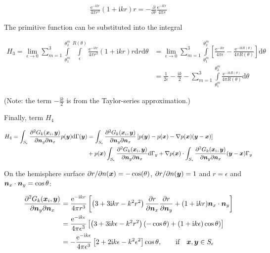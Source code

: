 \documentclass[a4paper, 10pt]{article}
\newcommand{\te}{\mathrm{e}}
\newcommand{\ti}{\mathrm{i}}
\newcommand{\td}{\mathrm{d}}
\newcommand{\tn}{\bm{\mathnormal{n}}}
\newcommand{\sx}{\bm{\mathnormal{x}}}
\newcommand{\sy}{\bm{\mathnormal{y}}}
\newcommand{\sn}{\bm{\mathnormal{n}}}
\newcommand{\limeps}{\lim\limits_{\epsilon \rightarrow 0}}
\newcommand{\summ}{\sum\limits_{m=1}^3}
\newcommand{\intme}{\int\limits_{\theta_1^m}^{\theta_2^m}\int\limits_\epsilon^{R(\theta)}}
\newcommand{\intms}{\int\limits_{\theta_1^m}^{\theta_2^m}}
\begin{document}
\begin{align}
	\frac{\te^{- \ti kr}}{4 \pi r^3}\left(1 + \ti kr\right) r = -\frac{\partial}{\partial r}\frac{\te ^ {-\ti kr}}{4\pi r}
\end{align}

The primitive function can be substituted into the integral

\begin{align}
	H_3 = \limeps \summ \intme \frac{\te^{- \ti kr}}{4 \pi r^3}\left(1 + \ti kr\right) r \mathrm{d} r \mathrm{d} \theta & =
	\limeps \summ \intms \left[\frac{\te ^{-\ti k \epsilon}}{4 \pi \epsilon} - \frac{\te ^{-\ti k R(\theta)}}{4 \pi R(\theta)}\right] \mathrm{d} \theta \nonumber\\ 
	& = \frac{1}{2\epsilon} - \frac{\ti k}{2}- \summ \intms \frac{\te ^{-\ti k R(\theta)}}{4 \pi R(\theta)} \mathrm{d} \theta
\end{align}

(Note: the term $-\frac{\ti k}{2}$ is from the Taylor-series approximation.)

Finally, term $H_4$

\begin{align}
	H_4 = \int_{S_\epsilon} \frac{\partial^2{G}_k (\sx_i, \sy)}{\partial \sn_y \partial \sn_x} p(\sy) \td \Gamma(\sy)
	& = \int_{S_\epsilon} \frac{\partial^2{G}_k (\sx_i, \sy)}{\partial \sn_y \partial \sn_x} \left[p(\sy) - p(\sx) - \nabla p(\sx) (\sy - \sx)\right]\nonumber \\
	& + p(\sx) \int_{S_\epsilon} \frac{\partial^2{G}_k (\sx_i, \sy)}{\partial \sn_y \partial \sn_x} \mathrm{d} \Gamma_y
	+ \nabla p(\sx) \cdot \int_{S_\epsilon} \frac{\partial^2{G}_k (\sx_i, \sy)}{\partial \sn_y \partial \sn_x} (\sy - \sx) \Gamma_y
\end{align}

On the hemisphere surface $\partial r / \partial n(\sx) = -\cos(\theta)$, $\partial r / \partial n(\sy) = 1$ and $r = \epsilon$ and  $\sn_x \cdot \sn_y = \cos \theta$:

\begin{align}
	\frac{\partial^2{G}_k (\sx_i, \sy)}{\partial \sn_y \partial \sn_x} & = 
	\frac{\te^{- \ti kr}}{4 \pi r^3}\left[\left(3 + 3 \ti kr - k^2 r^2\right) \frac{\partial r}{\partial \tn_x}\frac{\partial r}{\partial \tn_y} + (1 + \ti kr) \tn_x \cdot \tn_y \right] \nonumber \\
	& = \frac{\te^{- \ti k\epsilon}}{4 \pi \epsilon^3}\left[\left(3 + 3 \ti k\epsilon - k^2 r^2\right) (-\cos \theta) + (1 + \ti k\epsilon) \cos \theta) \right] \nonumber \\
	& = - \frac{\te^{-\ti k \epsilon}}{4 \pi \epsilon^3} \left[2 + 2\ti k \epsilon -k^2 \epsilon^2\right] \cos \theta , \qquad \text{if} \quad \sx, \sy \in S_\epsilon
\end{align}
\end{document}
